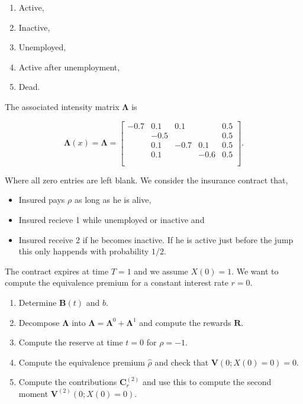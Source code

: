 \documentclass[a4paper,12pt,openany]{book}
\providecommand{\tightlist}{%
 \setlength{\itemsep}{0pt}\setlength{\parskip}{0pt}}
\begin{document}
\begin{enumerate}
\def\labelenumi{\arabic{enumi}.}
\tightlist
\item
  Active,
\item
  Inactive,
\item
  Unemployed,
\item
  Active after unemployment,
\item
  Dead.
\end{enumerate}

The associated intensity matrix \(\mathbf \Lambda\) is

\[
\mathbf\Lambda(x)=\mathbf \Lambda=
\begin{bmatrix}
-0.7 & 0.1 & 0.1&    &0.5 \\
 &-0.5 &  &  & 0.5 \\
 & 0.1& -0.7 & 0.1 & 0.5\\
 & 0.1 & & -0.6 & 0.5\\
 &  &  &  & \\
\end{bmatrix}.
\]

Where all zero entries are left blank. We consider the insurance contract that,

\begin{itemize}
\tightlist
\item
  Insured pays \(\rho\) as long as he is alive,
\item
  Insured recieve 1 while unemployed or inactive and
\item
  Insured receive 2 if he becomes inactive. If he is active just before the jump this only happends with probability \(1/2\).
\end{itemize}

The contract expires at time \(T=1\) and we assume \(X(0)=1\). We want to compute the equivalence premium for a constant interest rate \(r=0\).

\begin{enumerate}
\def\labelenumi{\alph{enumi}.}
\tightlist
\item
  Determine \(\mathbf B(t)\) and \(b\).
\item
  Decompose \(\mathbf \Lambda\) into \(\mathbf \Lambda=\mathbf \Lambda^0+\mathbf \Lambda^1\) and compute the rewards \(\mathbf R\).
\item
  Compute the reserve at time \(t=0\) for \(\rho = -1\).
\item
  Compute the equivalence premium \(\hat\rho\) and check that \(\mathbf V(0;X(0)=0)=0\).
\item
  Compute the contributions \(\mathbf C_r^{(2)}\) and use this to compute the second moment \(\mathbf V^{(2)}(0;X(0)=0)\).
\end{enumerate}
\end{document}
